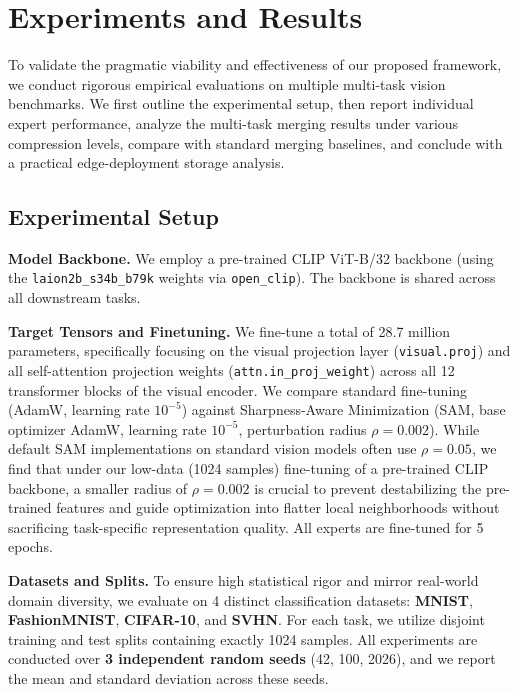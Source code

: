 \section{Experiments and Results}
\label{submission:sec:experiments}

To validate the pragmatic viability and effectiveness of our proposed framework, we conduct rigorous empirical evaluations on multiple multi-task vision benchmarks. We first outline the experimental setup, then report individual expert performance, analyze the multi-task merging results under various compression levels, compare with standard merging baselines, and conclude with a practical edge-deployment storage analysis.

\subsection{Experimental Setup}
\textbf{Model Backbone.} We employ a pre-trained CLIP ViT-B/32 \cite{radford2021learning} backbone (using the \texttt{laion2b\_s34b\_b79k} weights via \texttt{open\_clip}). The backbone is shared across all downstream tasks.

\textbf{Target Tensors and Finetuning.} We fine-tune a total of 28.7 million parameters, specifically focusing on the visual projection layer (\texttt{visual.proj}) and all self-attention projection weights (\texttt{attn.in\_proj\_weight}) across all 12 transformer blocks of the visual encoder. We compare standard fine-tuning (AdamW, learning rate $10^{-5}$) against Sharpness-Aware Minimization (SAM, base optimizer AdamW, learning rate $10^{-5}$, perturbation radius $\rho = 0.002$). While default SAM implementations on standard vision models often use $\rho = 0.05$, we find that under our low-data (1024 samples) fine-tuning of a pre-trained CLIP backbone, a smaller radius of $\rho = 0.002$ is crucial to prevent destabilizing the pre-trained features and guide optimization into flatter local neighborhoods without sacrificing task-specific representation quality. All experts are fine-tuned for 5 epochs.

\textbf{Datasets and Splits.} To ensure high statistical rigor and mirror real-world domain diversity, we evaluate on 4 distinct classification datasets: \textbf{MNIST}, \textbf{FashionMNIST}, \textbf{CIFAR-10}, and \textbf{SVHN}. For each task, we utilize disjoint training and test splits containing exactly 1024 samples. All experiments are conducted over \textbf{3 independent random seeds} (42, 100, 2026), and we report the mean and standard deviation across these seeds.

